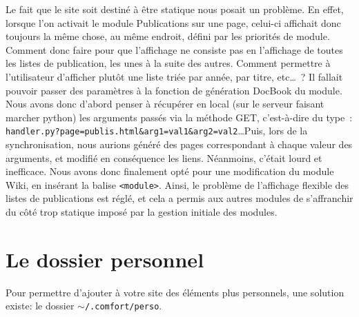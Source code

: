 \documentclass[final,11pt,a4paper,twoside,titlepage]{article}
\newcommand{\p}{\vspace{0.3em}}
\newcommand{\code}[1]{\texttt{#1}}
\begin{document}
{    Le fait que le site soit destiné à être statique nous posait un problème. En effet,
    lorsque l'on activait le module Publications sur une page, celui-ci affichait donc
    toujours la même chose, au même endroit, défini par les priorités de module. Comment
    donc faire pour que l'affichage ne consiste pas en l'affichage de toutes les listes
    de publication, les unes à la suite des autres. Comment permettre à l'utilisateur
    d'afficher plutôt une liste triée par année, par titre, etc\dots~? Il fallait pouvoir
    passer des paramètres à la fonction de génération DocBook du module. Nous avons
    donc d'abord penser à récupérer en local (sur le serveur faisant marcher python)
    les arguments passés via la méthode GET, c'est-à-dire du type~: 
    \code{handler.py?page=publis.html\&arg1=val1\&arg2=val2}\dots Puis,
    lors de la synchronisation, nous aurions généré des pages
    correspondant à chaque valeur des arguments, et modifié
    en conséquence les liens. Néanmoins, c'était lourd et inefficace. 
    Nous avons donc finalement opté pour une modification du module Wiki, en insérant la
    balise \code{<module>}. Ainsi, le problème de l'affichage flexible des listes de 
    publications est réglé, et cela a permis aux autres modules de s'affranchir du côté
    trop statique imposé par la gestion initiale des modules.
  
  \section{Le dossier personnel}
    Pour permettre d'ajouter à votre site des éléments plus personnels, une
    solution existe: le dossier \code{$\sim$/.comfort/perso}.\p    
    
}
\end{document}
